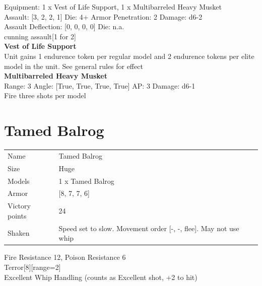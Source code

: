 Equipment: 1 x Vest of Life Support, 1 x Multibarreled Heavy Musket \\

Assault: [3, 2, 2, 1] Die: 4+ Armor Penetration: 2 Damage: d6-2 \\
Assault Deflection: [0, 0, 0, 0] Die: n.a.\\
\indent cunning assault[1 for 2]\\ 
 



{\bf Vest of Life Support } \\

Unit gains 1 endurence token per regular model  and 2 endurence tokens per elite model in the unit. See general rules for effect\\ 





{\bf Multibarreled Heavy Musket } \\



Range: 3  Angle: [True, True, True, True] AP: 3 Damage: d6-1 \\
Fire three shots per model\\ 




 















\clearpage

\section{ Tamed Balrog }

\begin{tabular}{ll}
  Name & Tamed Balrog \\
  Size & Huge\\
  Models & 1 x Tamed Balrog\\
  Armor & [8, 7, 7, 6]\\
  Victory points & 24\\
  Shaken & Speed set to slow. Movement order [-, -, flee]. May not use whip\\
\end{tabular}

Fire Resistance 12, Poison Resistance 6\\ 
Terror[8][range=2]\\ 
Excellent Whip Handling (counts as Excellent shot, +2 to hit)\\ 



